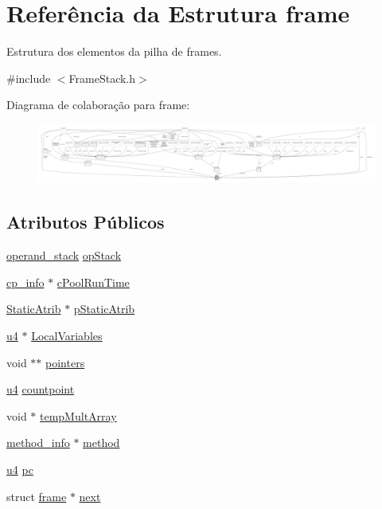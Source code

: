 \hypertarget{structframe}{}\section{Referência da Estrutura frame}
\label{structframe}


Estrutura dos elementos da pilha de frames.  




{\ttfamily \#include $<$Frame\+Stack.\+h$>$}



Diagrama de colaboração para frame\+:
\nopagebreak
\begin{figure}[H]
\begin{center}
\leavevmode
\includegraphics[width=350pt]{structframe__coll__graph}
\end{center}
\end{figure}
\subsection*{Atributos Públicos}
\begin{DoxyCompactItemize}
\item 
\hyperlink{structoperand__stack}{operand\+\_\+stack} \hyperlink{structframe_ac87e8a50c7f6d37600c44c1faca0f530}{op\+Stack}
\item 
\hyperlink{structcp__info}{cp\+\_\+info} $\ast$ \hyperlink{structframe_af9ce330bb6f6e4d7b2a5fb046f08e4dc}{c\+Pool\+Run\+Time}
\item 
\hyperlink{structStaticAtrib}{Static\+Atrib} $\ast$ \hyperlink{structframe_adf21113594c388521fe0f3591241f597}{p\+Static\+Atrib}
\item 
\hyperlink{ClassLoader_8h_aedf6ddc03df8caaaccbb4c60b9a9b850}{u4} $\ast$ \hyperlink{structframe_a1c91e0ecde5fe1fee5bf295f096b511f}{Local\+Variables}
\item 
void $\ast$$\ast$ \hyperlink{structframe_a29911524013a45af719b6d19592dc60d}{pointers}
\item 
\hyperlink{ClassLoader_8h_aedf6ddc03df8caaaccbb4c60b9a9b850}{u4} \hyperlink{structframe_aa4ce8c8307208f3fdf27b5a81fc265af}{countpoint}
\item 
void $\ast$ \hyperlink{structframe_ae25d34f063809e9990a1279fa9a794f4}{temp\+Mult\+Array}
\item 
\hyperlink{structmethod__info}{method\+\_\+info} $\ast$ \hyperlink{structframe_a2fac8190b89a1cf94c23628f1849a939}{method}
\item 
\hyperlink{ClassLoader_8h_aedf6ddc03df8caaaccbb4c60b9a9b850}{u4} \hyperlink{structframe_ae2f8c8d0abb0ff0952fb8ab971c2d3d0}{pc}
\item 
struct \hyperlink{structframe}{frame} $\ast$ \hyperlink{structframe_a23c908c0892e1329c82f3673e1d659eb}{next}
\end{DoxyCompactItemize}


